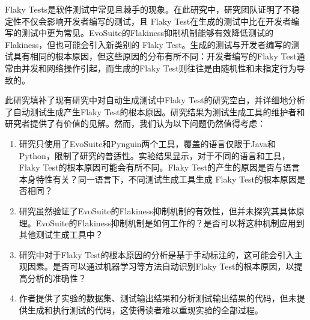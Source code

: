 \documentclass{article}
\newcommand{\flakyTest}{Flaky Test}
\begin{document}
\flakyTest s是软件测试中常见且棘手的现象。在此研究中，研究团队证明了不稳定性不仅会影响开发者编写的测试，且 \flakyTest 在生成的测试中比在开发者编写的测试中更为常见。EvoSuite的Flakiness抑制机制能够有效降低测试的Flakiness，但也可能会引入新类别的 \flakyTest。生成的测试与开发者编写的测试具有相同的根本原因，但这些原因的分布有所不同：开发者编写的\flakyTest 通常由并发和网络操作引起，而生成的\flakyTest 则往往是由随机性和未指定行为导致的。 

此研究填补了现有研究中对自动生成测试中\flakyTest 的研究空白，并详细地分析了自动测试生成产生\flakyTest 的根本原因。研究结果为测试生成工具的维护者和研究者提供了有价值的见解。然而，我们认为以下问题仍然值得考虑：

\begin{enumerate}[label=(\arabic*),noitemsep]
    \item 研究只使用了EvoSuite和Pynguin两个工具，覆盖的语言仅限于Java和Python，限制了研究的普适性。实验结果显示，对于不同的语言和工具，\flakyTest 的根本原因可能会有所不同。\flakyTest 的产生的原因是否与语言本身特性有关？同一语言下，不同测试生成工具生成 \flakyTest 的根本原因是否相同？
    \item 研究虽然验证了EvoSuite的Flakiness抑制机制的有效性，但并未探究其具体原理。EvoSuite的Flakiness抑制机制是如何工作的？是否可以将这种机制应用到其他测试生成工具中？
    \item 研究中对于\flakyTest 的根本原因的分析是基于手动标注的，这可能会引入主观因素。是否可以通过机器学习等方法自动识别\flakyTest 的根本原因，以提高分析的准确性？
    \item 作者提供了实验的数据集、测试输出结果和分析测试输出结果的代码，但未提供生成和执行测试的代码，这使得读者难以重现实验的全部过程。
\end{enumerate}
\end{document}

